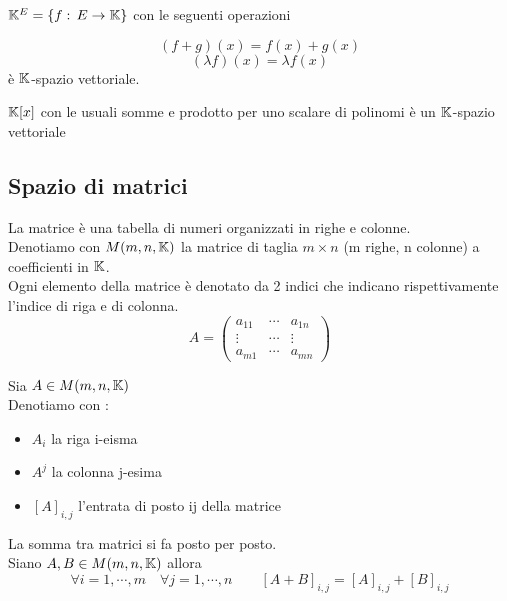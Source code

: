 \begin{ese} $ \mathbb{K} ^ E = \{ f : \, E \to \mathbb{K} \} $ con le seguenti operazioni 

$$ (f+g) (x)=f(x)+g(x) $$
$$ ( \lambda f ) (x)=\lambda f(x) $$
\`e $\mathbb{K}$-spazio vettoriale.\\
\end{ese}
\begin{ese}
$\mathbb{K}[x] $ con le usuali somme e prodotto per uno scalare di polinomi \`e un $\mathbb{K}$-spazio vettoriale
\end{ese}
\newpage

\subsection{Spazio di matrici}

La matrice è una tabella di numeri organizzati in righe e colonne.\\
Denotiamo con $M(m,n,\mathbb{K})$  la matrice di taglia $m \times n $ (m righe, n colonne) a coefficienti in $\mathbb{K}$.\\
Ogni elemento della matrice è denotato da 2 indici che indicano rispettivamente l'indice di riga e di colonna.
$$ A=\begin{pmatrix} a_{11} &  \cdots &a_{1n}\\
\vdots & \cdots & \vdots \\
a_{m1} & \cdots & a_{mn}
\end{pmatrix}$$

\begin{defn} Sia $ A \in M(m,n, \mathbb{K} ) $\\
Denotiamo con : 
\begin{itemize}
\item $A_i$ la riga i-eisma
\item $A^j$ la colonna j-esima
\item $[A]_{i,j}$ l'entrata di posto ij della matrice
\end{itemize}
\end{defn}

\spazio

\begin{defn}\bianco
La somma tra matrici si fa posto per posto.\\
Siano $A, B \in M (m,n,\mathbb{K} ) $ allora $$\forall i= 1,\cdots ,m \quad \forall j=1,\cdots , n\qquad [A+B]_{i,j}=[A]_{i,j}+[B]_{i,j}$$
\end{defn}

